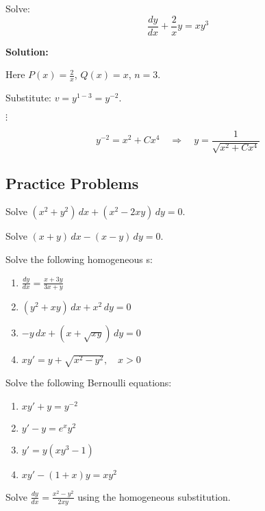 \begin{example}
  Solve:
  $$
  \frac{dy}{dx} + \frac{2}{x}y = xy^3
  $$

  \textbf{Solution:}

  Here $P(x) = \tfrac{2}{x}$, $Q(x)=x$, $n=3$.

  Substitute: $v = y^{1-3} = y^{-2}$.

  $
  \vdots
  $

  $$
  y^{-2} = x^2 + Cx^4 \quad \Rightarrow \quad y = \frac{1}{\sqrt{x^2 + Cx^4}}
  $$
\end{example}


\subsection*{Practice Problems}
  \begin{question}
    Solve \((x^2 + y^2)\,dx + (x^2 - 2xy)\,dy = 0.\)
  \end{question}

  \begin{question}
    Solve \((x + y)\,dx - (x - y)\,dy = 0.\)
  \end{question}

  \begin{question}
    Solve the following homogeneous \ode{}s:
    \begin{enumerate}
      \item \(\frac{dy}{dx} = \frac{x+3y}{3x+y}\)
      \item \((y^2 + xy)\,dx + x^2\,dy = 0\)
      \item \(-y\,dx + (x+ \sqrt{xy})\,dy = 0\)
      \item \(xy' = y + \sqrt{x^2 - y^2}, \quad x>0\)
    \end{enumerate}
  \end{question}

  \begin{question}
    Solve the following Bernoulli equations:
    \begin{enumerate}
      \item \(xy' + y = y^{-2}\)
      \item \(y' - y = e^xy^2\)
      \item \(y' = y(xy^3 - 1)\)
      \item \(xy' - (1+x)y =xy^2\)
    \end{enumerate}
  \end{question}

  \begin{question}
    Solve $\displaystyle \frac{dy}{dx} = \frac{x^2 - y^2}{2xy}$ using the homogeneous substitution.
  \end{question}


